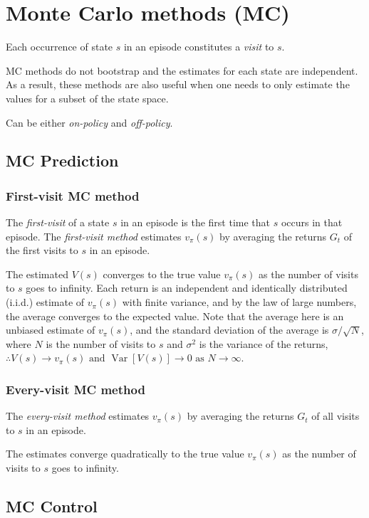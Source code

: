 \section{Monte Carlo methods (MC)}

Each occurrence of state \( s \) in an episode constitutes a \textit{visit} to \( s \).

MC methods do not bootstrap  and the estimates for each state are independent.
As a result, these methods are also useful when one needs to only estimate the values for a subset of the state space.

Can be either \textit{on-policy} and \textit{off-policy}.

\subsection{MC Prediction}

\subsubsection{First-visit MC method}

The \textit{first-visit} of a state \( s \) in an episode is the first time that \( s \) occurs in that episode.
The \textit{first-visit method} estimates \( v_\pi(s) \) by averaging the returns \( G_t \) of the first visits to \( s \) in an episode.

The estimated \( V(s) \) converges to the true value \( v_\pi(s) \) as the number of visits to \( s \) goes to infinity.
Each return is an independent and identically distributed (i.i.d.) estimate of \( v_\pi(s) \) with finite variance, and by the law of large numbers, the average converges to the expected value.
Note that the average here is an unbiased estimate of \( v_\pi(s) \), and the standard deviation of the average is \( \sigma / \sqrt{N} \), where \( N \) is the number of visits to \( s \) and \( \sigma^2 \) is the variance of the returns, \( \therefore V(s) \to v_\pi(s) \text{ and } \operatorname{Var}[V(s)] \to 0 \text{ as } N \to \infty \).

\subsubsection{Every-visit MC method}

The \textit{every-visit method} estimates \( v_\pi(s) \) by averaging the returns \( G_t \) of all visits to \( s \) in an episode.

The estimates converge quadratically to the true value \( v_\pi(s) \) as the number of visits to \( s \) goes to infinity.

\subsection{MC Control}
